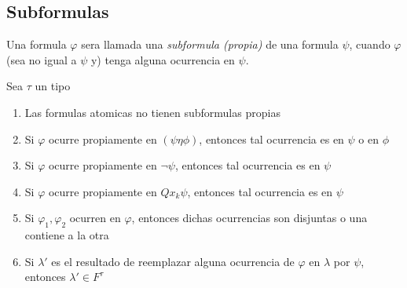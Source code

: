 \subsection{Subformulas}
\begin{definition}
  Una formula $\varphi$ sera llamada una \emph{subformula (propia)} de una formula $\psi$, cuando $\varphi$ (sea no igual a $\psi$ y)
  tenga alguna ocurrencia en $\psi$.
\end{definition}
\begin{lemma}
  Sea $\tau$ un tipo
  \begin{enumerate}
    \item Las formulas atomicas no tienen subformulas propias
    \item Si $\varphi$ ocurre propiamente en $(\psi\eta\phi)$, entonces tal ocurrencia es en $\psi$ o en $\phi$
    \item Si $\varphi$ ocurre propiamente en $\neg\psi$, entonces tal ocurrencia es en $\psi$
    \item Si $\varphi$ ocurre propiamente en $Qx_k\psi$, entonces tal ocurrencia es en $\psi$
    \item Si $\varphi_1, \varphi_2$ ocurren en $\varphi$, entonces dichas ocurrencias son disjuntas o una contiene a la otra
    \item Si $\lambda'$ es el resultado de reemplazar alguna ocurrencia de $\varphi$ en $\lambda$ por $\psi$, entonces $\lambda' \in F^\tau$
  \end{enumerate}
\end{lemma}
\noproof
